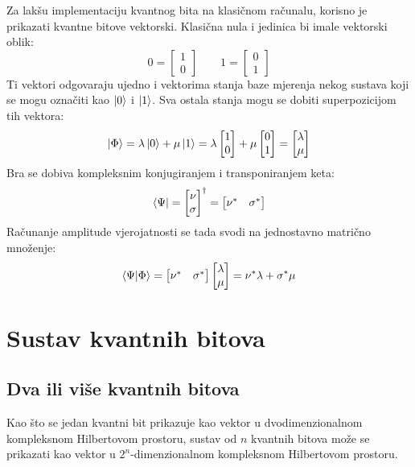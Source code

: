 Za lakšu implementaciju kvantnog bita na klasičnom računalu, korisno je prikazati kvantne bitove vektorski. Klasična nula i jedinica bi imale vektorski oblik:
\[
0 = \begin{bmatrix}
1 \\ 0
\end{bmatrix}
\qquad
1 = \begin{bmatrix}
0 \\ 1
\end{bmatrix}
\]
Ti vektori odgovaraju ujedno i vektorima stanja baze mjerenja nekog sustava koji se mogu označiti kao $\ket{0}$ i $\ket{1}$. Sva ostala stanja mogu se dobiti superpozicijom tih vektora:
\[
\ket{\Phi} = \lambda\ket{0} + \mu\ket{1} = \lambda\begin{bmatrix}
1 \\ 0
\end{bmatrix} + \mu\begin{bmatrix}
0 \\ 1
\end{bmatrix} = \begin{bmatrix}
\lambda \\ \mu
\end{bmatrix}
\]
Bra se dobiva kompleksnim konjugiranjem i transponiranjem keta:
\[
\bra{\Psi} = \begin{bmatrix}
\nu \\ \sigma
\end{bmatrix}^\dagger
= \begin{bmatrix}
\nu^* & \sigma^*
\end{bmatrix}
\]
Računanje amplitude vjerojatnosti se tada svodi na jednostavno matrično množenje:
\[
\braket{\Psi|\Phi} = \begin{bmatrix}
\nu^* & \sigma^*
\end{bmatrix}
\begin{bmatrix}
\lambda \\ \mu
\end{bmatrix} = \nu^*\lambda + \sigma^*\mu
\]



\section{Sustav kvantnih bitova}

\subsection{Dva ili više kvantnih bitova}
Kao što se jedan kvantni bit prikazuje kao vektor u dvodimenzionalnom kompleksnom Hilbertovom prostoru, sustav od $n$ kvantnih bitova može se prikazati kao vektor u $2^n$-dimenzionalnom kompleksnom Hilbertovom prostoru.

